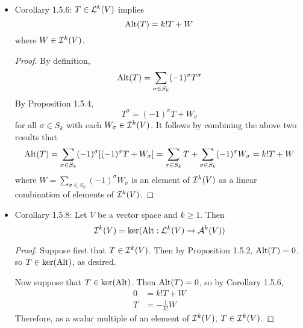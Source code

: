 \documentclass[../notes.tex]{subfiles}
\begin{document}
\begin{itemize}
\begin{proof}
\begin{align*}
            &= (-1)^\tau(-1)^\beta T+\cdots\tag*{Inductive hypothesis}\\
            &= (-1)^\sigma T+\cdots\tag*{Claim 1.4.9}
        \end{align*}
        where the dots are elements of $\ide[k]{V}$.
    \end{proof}
    \item Corollary 1.5.6: $T\in\lin[k]{V}$ implies
    \begin{equation*}
        \Alt(T) = k!T+W
    \end{equation*}
    where $W\in\ide[k]{V}$.
    \begin{proof}
        By definition,
        \begin{equation*}
            \Alt(T) = \sum_{\sigma\in S_k}(-1)^\sigma T^\sigma
        \end{equation*}
        By Proposition 1.5.4,
        \begin{equation*}
            T^\sigma = (-1)^\sigma T+W_\sigma
        \end{equation*}
        for all $\sigma\in S_k$ with each $W_\sigma\in\ide[k]{V}$. It follows by combining the above two results that
        \begin{equation*}
            \Alt(T) = \sum_{\sigma\in S_k}(-1)^\sigma[(-1)^\sigma T+W_\sigma]
            = \sum_{\sigma\in S_k}T+\sum_{\sigma\in S_k}(-1)^\sigma W_\sigma
            = k!T+W
        \end{equation*}
        where $W=\sum_{\sigma\in S_k}(-1)^\sigma W_\sigma$ is an element of $\ide[k]{V}$ as a linear combination of elements of $\ide[k]{V}$.
    \end{proof}
    \item Corollary 1.5.8: Let $V$ be a vector space and $k\geq 1$. Then
    \begin{equation*}
        \ide[k]{V} = \ker(\Alt:\lin[k]{V}\to\alt[k]{V})
    \end{equation*}
    \begin{proof}
        Suppose first that $T\in\ide[k]{V}$. Then by Proposition 1.5.2, $\Alt(T)=0$, so $T\in\ker(\Alt)$, as desired.\par
        Now suppose that $T\in\ker(\Alt)$. Then $\Alt(T)=0$, so by Corollary 1.5.6,
        \begin{align*}
            0 &= k!T+W\\
            T &= -\frac{1}{k!}W
        \end{align*}
        Therefore, as a scalar multiple of an element of $\ide[k]{V}$, $T\in\ide[k]{V}$.

\end{proof}
\end{itemize}
\end{document}
